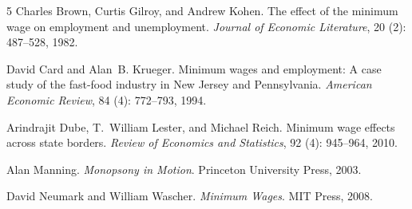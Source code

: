 \documentclass[11pt]{article}
\begin{document}

\begin{thebibliography}{5}
\providecommand{\natexlab}[1]{#1}
Charles Brown, Curtis Gilroy, and Andrew Kohen.
\newblock The effect of the minimum wage on employment and unemployment.
\newblock \emph{Journal of Economic Literature}, 20 (2): 487--528, 1982.

David Card and Alan~B. Krueger.
\newblock Minimum wages and employment: A case study of the fast-food industry in New
  Jersey and Pennsylvania.
\newblock \emph{American Economic Review}, 84 (4): 772--793, 1994.

Arindrajit Dube, T.~William Lester, and Michael Reich.
\newblock Minimum wage effects across state borders.
\newblock \emph{Review of Economics and Statistics}, 92 (4): 945--964, 2010.

Alan Manning.
\newblock \emph{Monopsony in Motion}.
\newblock Princeton University Press, 2003.

David Neumark and William Wascher.
\newblock \emph{Minimum Wages}.
\newblock MIT Press, 2008.
\end{thebibliography}
\end{document}
